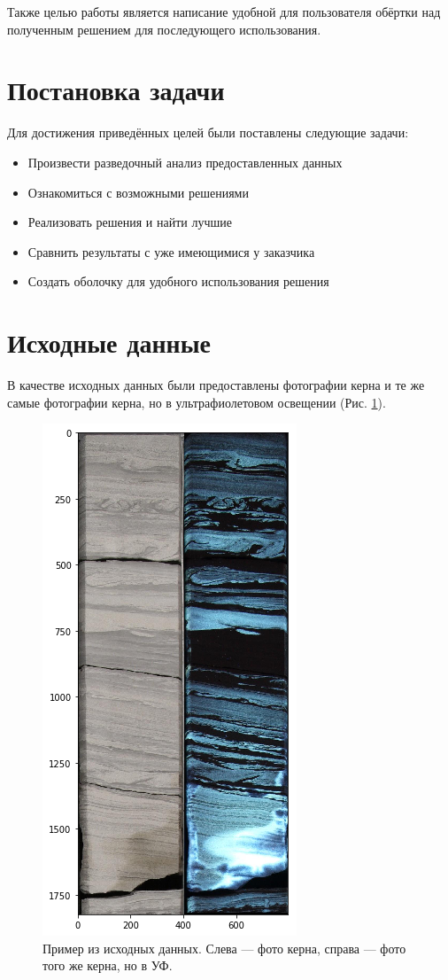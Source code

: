\documentclass[14pt]{matmex-diploma}
\begin{document}
    Также целью работы является написание удобной для пользователя обёртки над полученным решением для последующего использования.


\section{Постановка задачи}

    Для достижения приведённых целей были поставлены следующие задачи:
    
    \begin{itemize}
        \item Произвести разведочный анализ предоставленных данных
        \item Ознакомиться с возможными решениями
        \item Реализовать решения и найти лучшие
        \item Сравнить результаты с уже имеющимися у заказчика
        \item Создать оболочку для удобного использования решения
    \end{itemize}    
    

\section{Исходные данные}

    В качестве исходных данных были предоставлены фотографии керна и те же самые фотографии керна, но в ультрафиолетовом освещении (Рис. \ref{sample}).
    
    \begin{figure}[h]
        \centering
        \includegraphics[scale=0.4]{images/sample.png}
        \caption{Пример из исходных данных. Слева — фото керна, справа — фото того же керна, но в УФ.}
        \label{sample}
    \end{figure}       
    
\end{document}
